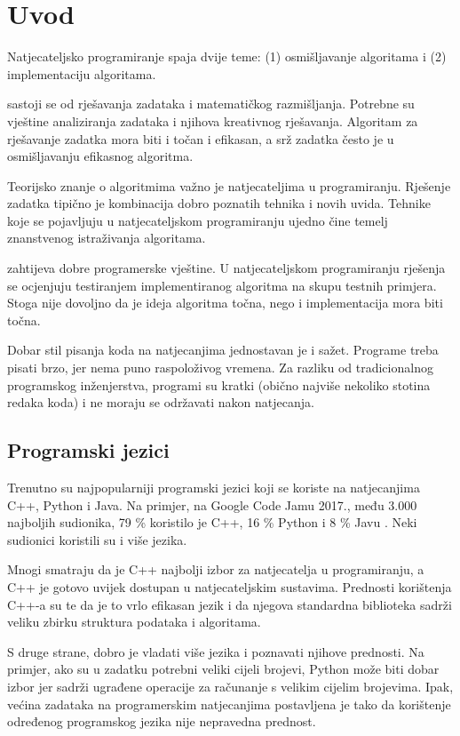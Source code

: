 \chapter{Uvod}

Natjecateljsko programiranje spaja dvije teme:
(1) osmišljavanje algoritama i (2) implementaciju algoritama.

 sastoji se od rješavanja zadataka
i matematičkog razmišljanja.
Potrebne su vještine analiziranja zadataka i njihova
kreativnog rješavanja.
Algoritam za rješavanje zadatka
mora biti i točan i efikasan,
a srž zadatka često je
u osmišljavanju efikasnog algoritma.

Teorijsko znanje o algoritmima
važno je natjecateljima u programiranju.
Rješenje zadatka tipično je
kombinacija dobro poznatih tehnika i
novih uvida.
Tehnike koje se pojavljuju u natjecateljskom programiranju
ujedno čine temelj znanstvenog istraživanja
algoritama.

 zahtijeva dobre
programerske vještine.
U natjecateljskom programiranju rješenja se
ocjenjuju testiranjem implementiranog algoritma
na skupu testnih primjera.
Stoga nije dovoljno da je ideja
algoritma točna, nego i implementacija
mora biti točna.

Dobar stil pisanja koda na natjecanjima
jednostavan je i sažet.
Programe treba pisati brzo,
jer nema puno raspoloživog vremena.
Za razliku od tradicionalnog programskog inženjerstva,
programi su kratki (obično najviše nekoliko
stotina redaka koda) i ne moraju se 
održavati nakon natjecanja.

\section{Programski jezici}


Trenutno su najpopularniji programski
jezici koji se koriste na natjecanjima C++, Python i Java.
Na primjer, na Google Code Jamu 2017.,
među 3.000 najboljih sudionika,
79 \% koristilo je C++,
16 \% Python i
8 \% Javu \cite{goo17}.
Neki sudionici koristili su i više jezika.

Mnogi smatraju da je C++ najbolji izbor
za natjecatelja u programiranju,
a C++ je gotovo uvijek dostupan u
natjecateljskim sustavima.
Prednosti korištenja C++-a su te da
je to vrlo efikasan jezik i
da njegova standardna biblioteka sadrži 
veliku zbirku
struktura podataka i algoritama.

S druge strane, dobro je
vladati više jezika i poznavati
njihove prednosti.
Na primjer, ako su u zadatku potrebni
veliki cijeli brojevi,
Python može biti dobar izbor jer
sadrži ugrađene operacije za
računanje s velikim cijelim brojevima.
Ipak, većina zadataka na programerskim natjecanjima
postavljena je tako da
korištenje određenog programskog jezika
nije nepravedna prednost.

